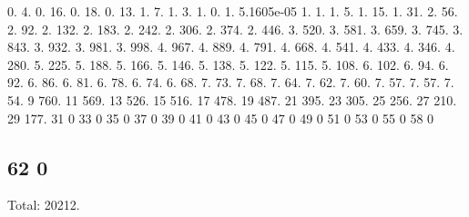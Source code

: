 0. 4. 0. 16. 0. 18. 0. 13. 1. 7. 1. 3. 1. 0. 1. 5.\+1605e-\/05 1. 1. 1. 5. 1. 15. 1. 31. 2. 56. 2. 92. 2. 132. 2. 183. 2. 242. 2. 306. 2. 374. 2. 446. 3. 520. 3. 581. 3. 659. 3. 745. 3. 843. 3. 932. 3. 981. 3. 998. 4. 967. 4. 889. 4. 791. 4. 668. 4. 541. 4. 433. 4. 346. 4. 280. 5. 225. 5. 188. 5. 166. 5. 146. 5. 138. 5. 122. 5. 115. 5. 108. 6. 102. 6. 94. 6. 92. 6. 86. 6. 81. 6. 78. 6. 74. 6. 68. 7. 73. 7. 68. 7. 64. 7. 62. 7. 60. 7. 57. 7. 57. 7. 54. 9 760. 11 569. 13 526. 15 516. 17 478. 19 487. 21 395. 23 305. 25 256. 27 210. 29 177. 31 0 33 0 35 0 37 0 39 0 41 0 43 0 45 0 47 0 49 0 51 0 53 0 55 0 58 0 \subsection*{62 0 }

Total\+: 20212. 